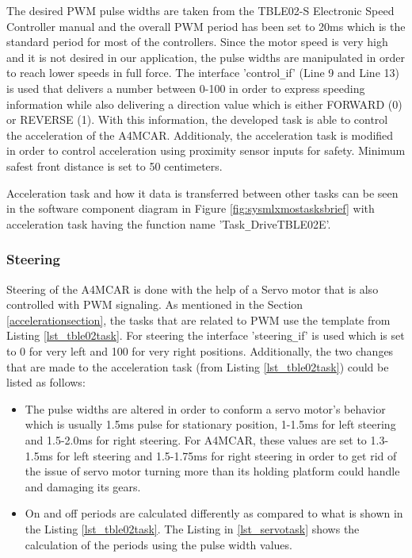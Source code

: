 \newpage
The desired PWM pulse widths are taken from the TBLE02-S Electronic Speed Controller manual and the overall PWM period has been set to 20ms which is the standard period for most of the controllers. Since the motor speed is very high and it is not desired in our application, the pulse widths are manipulated in order to reach lower speeds in full force. The interface 'control\texttt{\_}if' (Line 9 and Line 13) is used that delivers a number between 0-100 in order to express speeding information while also delivering a direction value which is either FORWARD (0) or REVERSE (1). With this information, the developed task is able to control the acceleration of the A4MCAR. Additionaly, the acceleration task is modified in order to control acceleration using proximity sensor inputs for safety. Minimum safest front distance is set to 50 centimeters.

Acceleration task and how it data is transferred between other tasks can be seen in the software component diagram in Figure \ref{fig:sysmlxmostasksbrief} with acceleration task having the function name 'Task\texttt{\_}DriveTBLE02E'.

\subsubsection{Steering}
Steering of the A4MCAR is done with the help of a Servo motor that is also controlled with PWM signaling. As mentioned in the Section \ref{accelerationsection}, the tasks that are related to PWM use the template from Listing \ref{lst_tble02task}. For steering the interface 'steering\texttt{\_}if' is used which is set to 0 for very left and 100 for very right positions. Additionally, the two changes that are made to the acceleration task (from Listing \ref{lst_tble02task}) could be listed as follows:
\begin{itemize}
	\item The pulse widths are altered in order to conform a servo motor's behavior which is usually 1.5ms pulse for stationary position, 1-1.5ms for left steering and 1.5-2.0ms for right steering. For A4MCAR, these values are set to 1.3-1.5ms for left steering and 1.5-1.75ms for right steering in order to get rid of the issue of servo motor turning more than its holding platform could handle and damaging its gears.
	\item On and off periods are calculated differently as compared to what is shown in the Listing \ref{lst_tble02task}. The Listing in \ref{lst_servotask} shows the calculation of the periods using the pulse width values.
	
\end{itemize}

